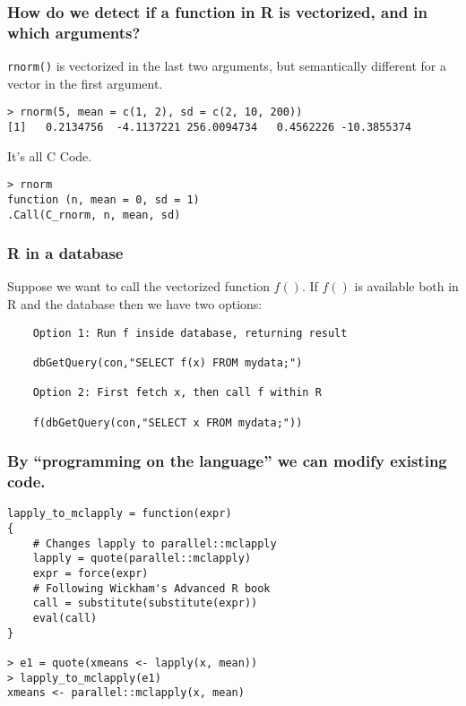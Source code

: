 \documentclass{beamer}
\begin{document}
\begin{frame}[fragile]

    \frametitle{How do we detect if a function in R is vectorized, and in
    which arguments?}

    \texttt{rnorm()} is vectorized in the last two arguments, but
    semantically different for a vector in the first argument.

\begin{verbatim}
> rnorm(5, mean = c(1, 2), sd = c(2, 10, 200))
[1]   0.2134756  -4.1137221 256.0094734   0.4562226 -10.3855374
\end{verbatim}

It's all C Code.

\begin{verbatim}
> rnorm
function (n, mean = 0, sd = 1)
.Call(C_rnorm, n, mean, sd)
\end{verbatim}

\end{frame}
\begin{frame}[fragile]

    \frametitle{R in a database}

    Suppose we want to call the vectorized function $f()$. If $f()$ is
    available both in R and the database then we have two options:

\begin{verbatim}
    Option 1: Run f inside database, returning result
    
    dbGetQuery(con,"SELECT f(x) FROM mydata;")

    Option 2: First fetch x, then call f within R

    f(dbGetQuery(con,"SELECT x FROM mydata;"))
\end{verbatim}

\end{frame}
\begin{frame}[fragile]

    \frametitle{By ``programming on the language'' we can modify existing
    code.}

\begin{verbatim}
lapply_to_mclapply = function(expr)
{
    # Changes lapply to parallel::mclapply
    lapply = quote(parallel::mclapply)
    expr = force(expr)
    # Following Wickham's Advanced R book
    call = substitute(substitute(expr))
    eval(call)
}

> e1 = quote(xmeans <- lapply(x, mean))
> lapply_to_mclapply(e1)
xmeans <- parallel::mclapply(x, mean)
\end{verbatim}

\end{frame}
\end{document}
